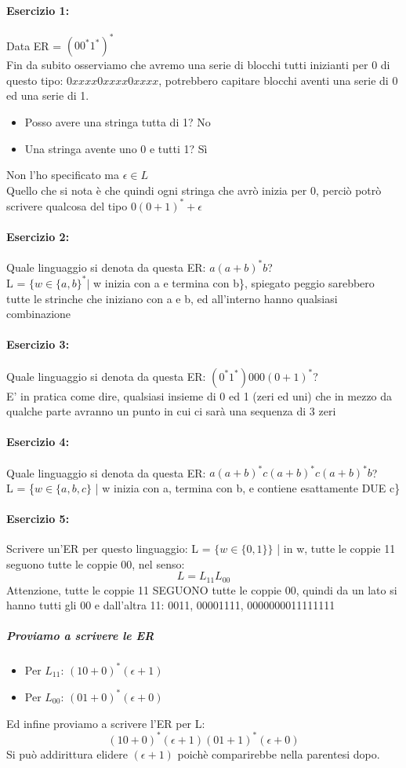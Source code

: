 \documentclass[12pt, a4paper, openany, oneside]{book}
\begin{document}
\paragraph{Esercizio 1: } Data ER = $(00^{*}1^{*})^{*}$\\ 
Fin da subito osserviamo che avremo una serie di blocchi tutti inizianti per
0 di questo tipo: $0xxxx0xxxx0xxxx$, potrebbero capitare blocchi aventi una
serie di 0 ed una serie di 1. 
\begin{itemize}
	\item Posso avere una stringa tutta di 1? No
	\item Una stringa avente uno 0 e tutti 1? Sì
\end{itemize}
Non l'ho specificato ma $\epsilon \in L$ \\
Quello che si nota è che quindi ogni stringa che avrò inizia per 0, perciò potrò
scrivere qualcosa del tipo $0(0+1)^{*} + \epsilon$
\paragraph{Esercizio 2: } Quale linguaggio si denota da questa ER: $a(a+b)^{*}b$?\\
L = $\{w \in \{a,b\}^{*} |$ w inizia con a e termina con b\}, spiegato peggio 
sarebbero tutte le strinche che iniziano con a e b, ed all'interno hanno 
qualsiasi combinazione
\paragraph{Esercizio 3: } Quale linguaggio si denota da questa ER: $(0^{*}1^{*})000(0+1)^{*}$?\\
E' in pratica come dire, qualsiasi insieme di 0 ed 1 (zeri ed uni) che in mezzo
da qualche parte avranno un punto in cui ci sarà una sequenza di 3 zeri
\paragraph{Esercizio 4: } Quale linguaggio si denota da questa ER: $a(a+b)^{*}c(a+b)^{*}c(a+b)^{*}b$?\\
L = \{$w\in \{a,b,c\}$ | w inizia con a, termina con b, e contiene esattamente DUE c\}
\paragraph{Esercizio 5: } Scrivere un'ER per questo linguaggio: 
L = $\{w\in \{0,1\}\}$ | in w, tutte le coppie 11 seguono tutte le coppie 00, 
nel senso:
\[
	L = L_{11}L_{00} 
\]
Attenzione, tutte le coppie 11 SEGUONO tutte le coppie 00, quindi da un lato
si hanno tutti gli 00 e dall'altra 11: 0011, 00001111, 0000000011111111 
\subparagraph{Proviamo a scrivere le ER } 
\begin{itemize}
	\item Per $L_{11}$: $(10+0)^{*}(\epsilon + 1)$
	\item Per $L_{00}$: $(01+0)^{*}(\epsilon + 0)$
\end{itemize}
Ed infine proviamo a scrivere l'ER per L:
\[
	(10+0)^{*} (\epsilon + 1) (01+1)^{*} (\epsilon + 0)
\]
Si può addirittura elidere $(\epsilon + 1)$ poichè comparirebbe nella parentesi
dopo.
\end{document}
